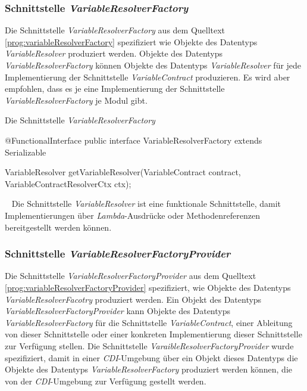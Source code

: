 \subsubsection{Schnittstelle \emph{VariableResolverFactory}}
\label{sec:variableResolverFactory}
Die Schnittstelle \emph{VariableResolverFactory} aus dem Quelltext  \ref{prog:variableResolverFactory} spezifiziert wie Objekte des Datentyps  \emph{VariableResolver} produziert werden. Objekte des Datentyps  \emph{VariableResolverFactory} können Objekte des Datentyps \emph{VariableResolver} für jede Implementierung der Schnittstelle \emph{VariableContract} produzieren. Es wird aber empfohlen, dass es je eine Implementierung der Schnittstelle \emph{VariableResolverFactory} je Modul gibt.
\newpage

\begin{program}
\caption{Die Schnittstelle \emph{VariableResolverFactory}}
\label{prog:variableResolverFactory}
\begin{JavaCode}
@FunctionalInterface
public interface VariableResolverFactory extends Serializable {

  VariableResolver getVariableResolver(VariableContract contract,
                                       VariableContractResolverCtx ctx);
                                       
}
\end{JavaCode}
\end{program}
\ \newline
Die Schnittstelle \emph{VariableResolver} ist eine funktionale Schnittstelle, damit Implementierungen über \emph{Lambda}-Ausdrücke oder Methodenreferenzen bereitgestellt werden können.

\subsubsection{Schnittstelle \emph{VariableResolverFactoryProvider}}
\label{sec:VariableResolverFactoryProvider}
Die Schnittstelle \emph{VariableResolverFactoryProvider} aus dem Quelltext  \ref{prog:variableResolverFactoryProvider} spezifiziert, wie Objekte des Datentyps  \emph{VariableResolverFacotry} produziert werden. Ein Objekt des Datentyps  \emph{VariableResolverFactoryProvider} kann Objekte des Datentyps  \emph{VariableResolverFactory} für die Schnittstelle \emph{VariableContract}, einer Ableitung von dieser Schnittstelle oder einer konkreten Implementierung dieser Schnittstelle zur Verfügung stellen. Die Schnittstelle \emph{VaraibleResolverFactoryProvider} wurde spezifiziert, damit in einer \emph{CDI}-Umgebung über ein Objekt dieses Datentyps die Objekte des Datentyps  \emph{VariableResolverFactory} produziert werden können, die von der \emph{CDI}-Umgebung zur Verfügung gestellt werden.

